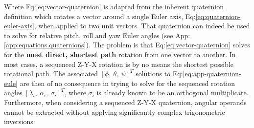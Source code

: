 Where Eq:\ref{eq:vector-quaternion} is adapted from the inherent quaternion definition which rotates a vector around a single Euler axis, Eq:\ref{eq:quaternion-euler-axis}, when applied to two unit vectors. That quaternion can indeed be used to solve for relative pitch, roll and yaw Euler angles (see App:\ref{app:equations.quaternions}). The problem is that Eq:\ref{eq:vector-quaternion} solves for the \textbf{most direct, shortest path} rotation from one vector to another. In most cases, a sequenced Z-Y-X rotation is by no means the shortest possible rotational path. The associated $[\phi,~\theta,~\psi]^T$ solutions to Eq:\ref{eq:app-quaternion-eule} are then of no consequence in trying to solve for the sequenced rotation angles $[\lambda_i,~\alpha_i,~\sigma_i]^T$, where $\sigma_i$ is already known to be an orthogonal multiplicate. Furthermore, when considering a sequenced Z-Y-X quaternion, angular operands cannot be extracted without applying significantly complex trigonometric inversions:
